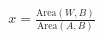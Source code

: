 \documentclass[preview]{standalone}
\begin{document}
\begin{align*}
x = \frac{\text{Area}(W, B)}{\text{Area}(A, B)}
\end{align*}
\end{document}
